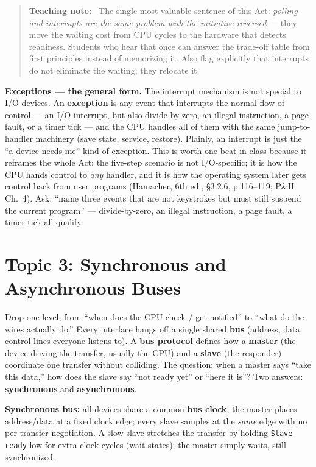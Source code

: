 \documentclass[11pt]{article}
\newenvironment{teachingaside}{\begin{quote}\small\color{primary-gold}\textbf{Teaching note:}\ }{\end{quote}}
\begin{document}
\begin{teachingaside}
The single most valuable sentence of this Act: \emph{polling and interrupts are the same problem with the initiative reversed} --- they move the waiting cost from CPU cycles to the hardware that detects readiness. Students who hear that once can answer the trade-off table from first principles instead of memorizing it. Also flag explicitly that interrupts do not eliminate the waiting; they relocate it.
\end{teachingaside}

\textbf{Exceptions --- the general form.} The interrupt mechanism is not special to I/O devices. An \textbf{exception} is any event that interrupts the normal flow of control --- an I/O interrupt, but also divide-by-zero, an illegal instruction, a page fault, or a timer tick --- and the CPU handles all of them with the same jump-to-handler machinery (save state, service, restore). Plainly, an interrupt is just the ``a device needs me'' kind of exception. This is worth one beat in class because it reframes the whole Act: the five-step scenario is not I/O-specific; it is how the CPU hands control to \emph{any} handler, and it is how the operating system later gets control back from user programs (Hamacher, 6th ed., \S3.2.6, p.116--119; P\&H Ch.~4). Ask: ``name three events that are not keystrokes but must still suspend the current program'' --- divide-by-zero, an illegal instruction, a page fault, a timer tick all qualify.

\section{Topic 3: Synchronous and Asynchronous Buses}

Drop one level, from ``when does the CPU check / get notified'' to ``what do the wires actually do.'' Every interface hangs off a single shared \textbf{bus} (address, data, control lines everyone listens to). A \textbf{bus protocol} defines how a \textbf{master} (the device driving the transfer, usually the CPU) and a \textbf{slave} (the responder) coordinate one transfer without colliding. The question: when a master says ``take this data,'' how does the slave say ``not ready yet'' or ``here it is''? Two answers: \textbf{synchronous} and \textbf{asynchronous}.

\textbf{Synchronous bus:} all devices share a common \textbf{bus clock}; the master places address/data at a fixed clock edge; every slave samples at the \emph{same} edge with no per-transfer negotiation. A slow slave stretches the transfer by holding \texttt{Slave-ready} low for extra clock cycles (wait states); the master simply waits, still synchronized.
\end{document}
